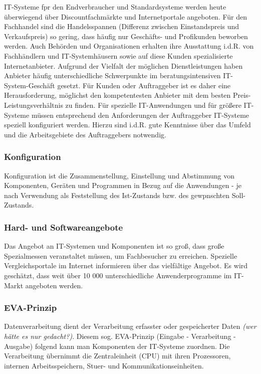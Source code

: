 \documentclass[a4paper, 12pt]{report}
\begin{document}
\begin{multicols}{2}
IT-Systeme fpr den Endverbraucher und Standardsysteme werden heute überwiegend
über Discountfachmärkte und Internetportale angeboten. Für den Fachhandel sind
die Handelsspannen (Differenz zwischen Einstandspreis und Verkaufspreis) so
gering, dass häufig nur Geschäfts- und Profikunden beworben werden. Auch
Behörden und Organisationen erhalten ihre Ausstattung i.d.R. von Fachhändlern
und IT-Systemhäusern sowie auf diese Kunden spezialisierte Internetanbieter.
Aufgrund der Vielfalt der möglichen Dienstleistungen haben Anbieter häufig
unterschiedliche Schwerpunkte im beratungsintensiven IT-System-Geschäft gesetzt.
Für Kunden oder Auftraggeber ist es daher eine Herausforderung, möglichst den
kompetentesten Anbieter mit dem besten Preis-Leistungsverhältnis zu finden.
Für spezielle IT-Anwendungen und für größere IT-Systeme müssen entsprechend den
Anforderungen der Auftraggeber IT-Systeme speziell konfiguriert werden. Hierzu
sind i.d.R. gute Kenntnisse über das Umfeld und die Arbeitsgebiete des
Auftraggebers notwendig. \\

\subsubsection{Konfiguration}

Konfiguration ist die Zusammenstellung, Einstellung und Abstimmung von
Komponenten, Geräten und Programmen in Bezug auf die Anwendungen - je nach
Verwendung als Feststellung des Ist-Zustands bzw. des gewpnschten Soll-Zustands.

\subsubsection{Hard- und Softwareangebote}

Das Angebot an IT-Systemen und Komponenten ist so groß, dass große Spezialmessen
veranstaltet müssen, um Fachbesucher zu erreichen. Spezielle Vergleichsportale
im Internet informieren über das vielfältige Angebot. Es wird geschätzt, dass
weit über 10 000 unterschiedliche Anwenderprogramme im IT-Markt angeboten
werden.

\subsubsection{EVA-Prinzip}

Datenverarbeitung dient der Verarbeitung erfasster oder gespeicherter Daten
\emph{(wer hätte es nur gedacht?)}. Diesem sog. EVA-Prinzip (Eingabe -
Verarbeitung - Ausgabe) folgend kann man Komponenten der IT-Systeme zuordnen.
Die Verarbeitung übernimmt die Zentraleinheit (CPU) mit ihren Prozessoren,
internen Arbeitsspeichern, Stuer- und Kommunikationseinheiten.


\end{multicols}
\end{document}
